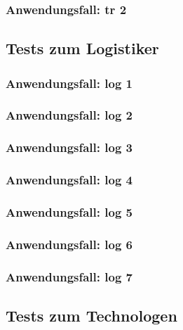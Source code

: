 \documentclass[enabledeprecatedfontcommands,fontsize=12pt,paper=a4,twoside]{scrartcl}
\begin{document}
\subsubsection{Anwendungsfall: tr 2}


\subsection{Tests zum Logistiker}

\subsubsection{Anwendungsfall: log 1}


\subsubsection{Anwendungsfall: log 2}


\subsubsection{Anwendungsfall: log 3}


\subsubsection{Anwendungsfall: log 4}


\subsubsection{Anwendungsfall: log 5}


\subsubsection{Anwendungsfall: log 6}


\subsubsection{Anwendungsfall: log 7}


\subsection{Tests zum Technologen}
\end{document}
